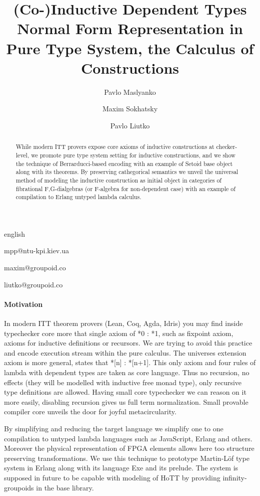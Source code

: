 \documentclass{abstract}
\begin{document}
\begin{theses}{english}

\title{(Co-)Inductive Dependent Types Normal Form Representation in Pure Type System, the Calculus of Constructions}
\author[1]{Pavlo Maslyanko}{mpp@ntu-kpi.kiev.ua}
\author[2]{Maxim Sokhatsky}{maxim@groupoid.co}
\author[3]{Pavlo Liutko}{liutko@groupoid.co}
\maketitle

\begin{abstract}
While modern ITT provers expose core axioms of inductive constructions at checker-level,
we promote pure type system setting for inductive constructions, and we show the
technique of Berrarducci-based encoding with an example of Setoid base object along with its theorems.
By preserving cathegorical semantics we unveil the universal method of modeling the
inductive construction as initial object in categories of fibrational F,G-dialgebras (or F-algebra
for non-dependent case) with an example of compilation to Erlang untyped lambda calculus.
\end{abstract}

\paragraph{Motivation}

In modern ITT theorem provers (Lean, Coq, Agda, Idris) you may find inside typechecker core more that
single axiom of *0 : *1, such as fixpoint axiom, axioms for inductive definitions or recursors.
We are trying to avoid this practice and encode execution stream within the pure calculus.
The universes extension axiom is more general, states that *[n] : *[n+1]. This only axiom and four
rules of lambda with dependent types are taken as core language. Thus no recursion,
no effects (they will be modelled with inductive free monad type), only recursive type definitions are allowed.
Having small core typechecker we can reason on it more easily, disabling recursion gives
us full term normalization. Small provable compiler core unveils the door for joyful metacircularity.

By simplifying and reducing the target language we simplify one to one compilation to untyped
lambda languages such as JavaScript, Erlang and others. Moreover the physical representation
of FPGA elements allows here too structure preserving transformations. We use this technique to prototype
 Martin-Löf type system in Erlang along with its language Exe and its prelude.
The system is supposed in future to be capable with modeling of HoTT by providing infinity-groupoids in the base library.


\end{theses}
\end{document}
